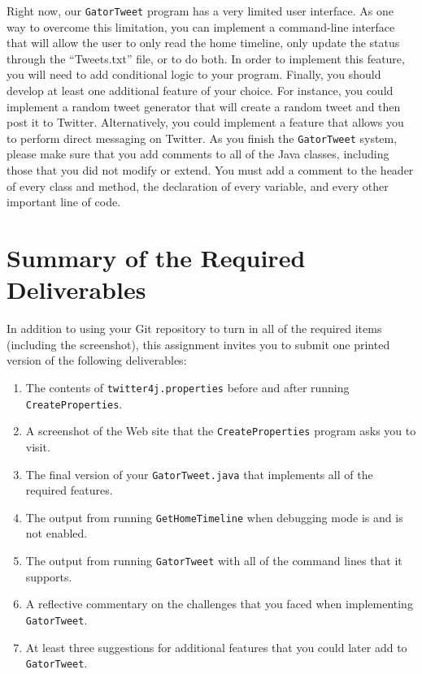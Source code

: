   Right now, our {\tt GatorTweet} program has a very limited user interface.  As one way to overcome this limitation, you can 
  implement a command-line interface that will allow the user to only read the home timeline, only update the status through the
  ``Tweets.txt'' file, or to do both.  In order to implement this feature, you will need to add conditional logic to your program.
  Finally, you should develop at least one additional feature of your choice.  For instance, you could implement a random tweet
  generator that will create a random tweet and then post it to Twitter. Alternatively, you could implement a feature that allows
  you to perform direct messaging on Twitter. As you finish the {\tt GatorTweet} system, please make sure that you add comments to
  all of the Java classes, including those that you did not modify or extend. You must add a comment to the header of every
  class and method, the declaration of every variable, and every other important line of code. 

\section*{Summary of the Required Deliverables}

In addition to using your Git repository to turn in all of the required items (including the screenshot), this
assignment invites you to submit one printed version of the following deliverables: 

  \begin{enumerate}
    \itemsep 0in
    \item The contents of {\tt twitter4j.properties} before and after running {\tt CreateProperties}.
    \item A screenshot of the Web site that the {\tt CreateProperties} program asks you to visit.
    \item The final version of your {\tt GatorTweet.java} that implements all of the required features.
    \item The output from running {\tt GetHomeTimeline} when debugging mode is and is not enabled.
    \item The output from running {\tt GatorTweet} with all of the command lines that it supports.
    \item A reflective commentary on the challenges that you faced when implementing {\tt GatorTweet}.
    \item At least three suggestions for additional features that you could later add to {\tt GatorTweet}.
  \end{enumerate}

